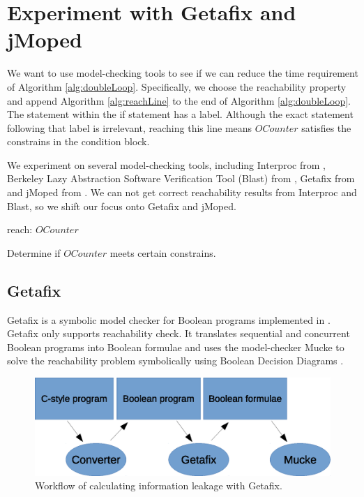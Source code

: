 \chapter{Experiment with Getafix and jMoped}
	\label{CH_04}

We want to use model-checking tools to see if we can reduce the time requirement of Algorithm \ref{alg:doubleLoop}. Specifically, we choose the reachability property and append Algorithm \ref{alg:reachLine} to the end of Algorithm \ref{alg:doubleLoop}. The statement within the if statement has a label. Although the exact statement following that label is irrelevant, reaching this line means $OCounter$ satisfies the constrains in the condition block.

We experiment on several model-checking tools, including Interproc from \cite{_interproc_2011}, Berkeley Lazy Abstraction Software Verification Tool (Blast) from \cite{_mtc_2008}, Getafix from \cite{la_torre_analyzing_2009} and jMoped from \cite{somejMopedCite}. We can not get correct reachability results from Interproc and Blast, so we shift our focus onto Getafix and jMoped.

\renewcommand{\algorithmiccomment}[1]{// #1}
\begin{algorithm}
\begin{algorithmic}

\STATE reach: $OCounter$
\ENDIF

\end{algorithmic}

\caption[Single loop]{Determine if $OCounter$ meets certain constrains.}
\label{alg:reachLine}
\end{algorithm}

\section{Getafix}
Getafix is a symbolic model checker for Boolean programs implemented in \cite{la_torre_analyzing_2009}. Getafix only supports reachability check. It translates sequential and concurrent Boolean programs into Boolean formulae and uses the model-checker Mucke to solve the reachability problem symbolically using Boolean Decision Diagrams \cite{_getafix_2009}. 

\begin{figure}
\centering
\includegraphics[scale=0.8]{Figures/workFlow}
\caption{Workflow of calculating information leakage with Getafix.}
\label{fig:workFlow}
\end{figure}


